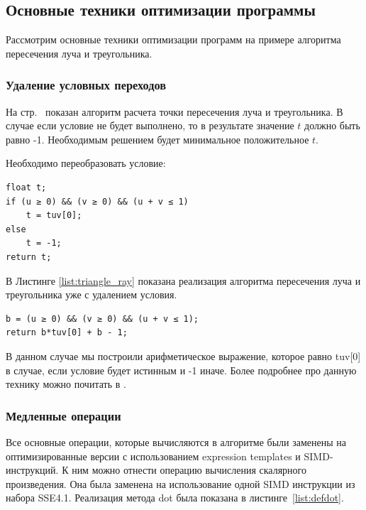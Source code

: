 \documentclass[12pt, a4paper, utf8]{article}
\begin{document}
\subsection{Основные техники оптимизации программы}

Рассмотрим основные техники оптимизации программ на примере алгоритма пересечения луча и треугольника.

\subsubsection{Удаление условных переходов}
На стр.~\pageref{alg:triabgle_ray} показан алгоритм расчета точки пересечения луча и треугольника. В случае если условие не будет выполнено, то в результате значение $t$ должно быть равно -1. Необходимым решением будет минимальное положительное $t$. 

Необходимо переобразовать условие:

\begin{verbatim}
float t;
if (u ≥ 0) && (v ≥ 0) && (u + v ≤ 1)
    t = tuv[0];
else
    t = -1;
return t;
\end{verbatim}

В Листинге \ref{list:triangle_ray} показана реализация алгоритма пересечения луча и треугольника уже с удалением условия. 
\begin{verbatim}
b = (u ≥ 0) && (v ≥ 0) && (u + v ≤ 1);
return b*tuv[0] + b - 1;
\end{verbatim}
В данном случае мы построили арифметическое выражение, которое равно tuv[0] в случае, если условие будет истинным и -1 иначе. Более подробнее про данную технику можно почитать в \cite{inteloptimize}.


\subsubsection{Медленные операции}

Все основные операции, которые вычисляются в алгоритме были заменены на оптимизированные версии с использованием expression templates и SIMD-инструкций.
К ним можно отнести операцию вычисления скалярного произведения. Она была заменена на использование одной SIMD инструкции из набора SSE4.1. Реализация метода dot была показана в листинге~\ref{list:defdot}. 
\end{document}
